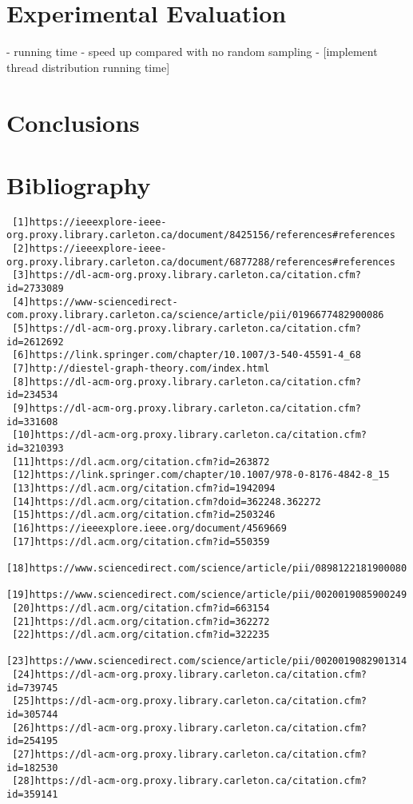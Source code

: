 \documentclass[]{article}
\begin{document}
 
 \section{Experimental Evaluation}
 - running time
 - speed up compared with no random sampling
 - [implement thread distribution running time]
 
 \section{Conclusions}
 \section{Bibliography}
 \begin{verbatim}
 [1]https://ieeexplore-ieee-org.proxy.library.carleton.ca/document/8425156/references#references
 [2]https://ieeexplore-ieee-org.proxy.library.carleton.ca/document/6877288/references#references
 [3]https://dl-acm-org.proxy.library.carleton.ca/citation.cfm?id=2733089
 [4]https://www-sciencedirect-com.proxy.library.carleton.ca/science/article/pii/0196677482900086
 [5]https://dl-acm-org.proxy.library.carleton.ca/citation.cfm?id=2612692
 [6]https://link.springer.com/chapter/10.1007/3-540-45591-4_68
 [7]http://diestel-graph-theory.com/index.html
 [8]https://dl-acm-org.proxy.library.carleton.ca/citation.cfm?id=234534 
 [9]https://dl-acm-org.proxy.library.carleton.ca/citation.cfm?id=331608
 [10]https://dl-acm-org.proxy.library.carleton.ca/citation.cfm?id=3210393
 [11]https://dl.acm.org/citation.cfm?id=263872
 [12]https://link.springer.com/chapter/10.1007/978-0-8176-4842-8_15
 [13]https://dl.acm.org/citation.cfm?id=1942094
 [14]https://dl.acm.org/citation.cfm?doid=362248.362272
 [15]https://dl.acm.org/citation.cfm?id=2503246
 [16]https://ieeexplore.ieee.org/document/4569669
 [17]https://dl.acm.org/citation.cfm?id=550359
 [18]https://www.sciencedirect.com/science/article/pii/0898122181900080
 [19]https://www.sciencedirect.com/science/article/pii/0020019085900249
 [20]https://dl.acm.org/citation.cfm?id=663154
 [21]https://dl.acm.org/citation.cfm?id=362272
 [22]https://dl.acm.org/citation.cfm?id=322235
 [23]https://www.sciencedirect.com/science/article/pii/0020019082901314
 [24]https://dl-acm-org.proxy.library.carleton.ca/citation.cfm?id=739745
 [25]https://dl-acm-org.proxy.library.carleton.ca/citation.cfm?id=305744
 [26]https://dl-acm-org.proxy.library.carleton.ca/citation.cfm?id=254195
 [27]https://dl-acm-org.proxy.library.carleton.ca/citation.cfm?id=182530
 [28]https://dl-acm-org.proxy.library.carleton.ca/citation.cfm?id=359141

\end{verbatim}
\end{document}
